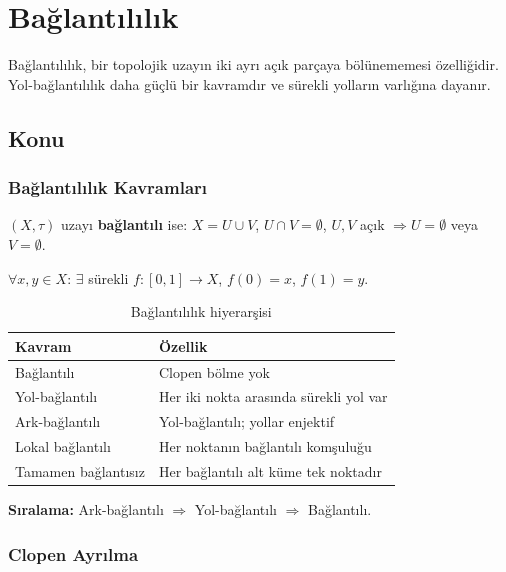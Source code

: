 \chapter{Bağlantılılık}

Bağlantılılık, bir topolojik uzayın iki ayrı açık parçaya bölünememesi özelliğidir.
Yol-bağlantılılık daha güçlü bir kavramdır ve sürekli yolların varlığına dayanır.

\section{Konu}

\subsection{Bağlantılılık Kavramları}

\begin{definition}
$(X, \tau)$ uzayı \textbf{bağlantılı} ise: $X = U \cup V$, $U \cap V = \emptyset$,
$U,V$ açık $\Rightarrow U = \emptyset$ veya $V = \emptyset$.
\end{definition}

\begin{definition}
$\forall x,y \in X$: $\exists$ sürekli $f:[0,1] \to X$, $f(0) = x$, $f(1) = y$.
\end{definition}

\begin{table}[h]
\centering
\begin{tabular}{ll}
\toprule
\textbf{Kavram} & \textbf{Özellik} \\
\midrule
Bağlantılı & Clopen bölme yok \\
Yol-bağlantılı & Her iki nokta arasında sürekli yol var \\
Ark-bağlantılı & Yol-bağlantılı; yollar enjektif \\
Lokal bağlantılı & Her noktanın bağlantılı komşuluğu \\
Tamamen bağlantısız & Her bağlantılı alt küme tek noktadır \\
\bottomrule
\end{tabular}
\caption{Bağlantılılık hiyerarşisi}
\end{table}

\textbf{Sıralama:} Ark-bağlantılı $\Rightarrow$ Yol-bağlantılı $\Rightarrow$ Bağlantılı.

\subsection{Clopen Ayrılma}

